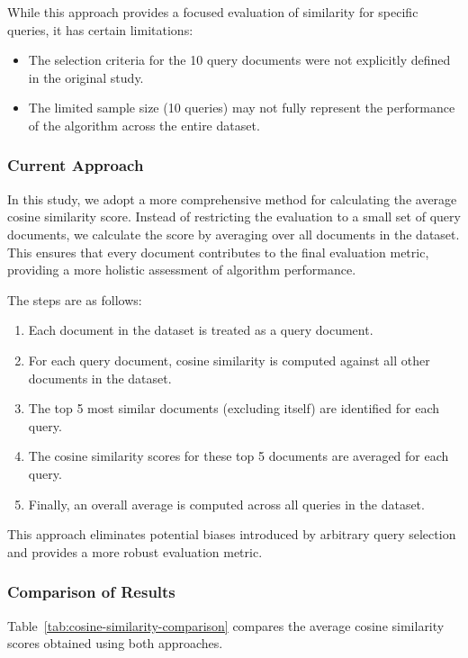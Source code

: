 \documentclass[12pt]{article}
\begin{document}
While this approach provides a focused evaluation of similarity for specific queries, it has certain limitations:
\begin{itemize}
    \item The selection criteria for the 10 query documents were not explicitly defined in the original study.
    \item The limited sample size (10 queries) may not fully represent the performance of the algorithm across the entire dataset.
\end{itemize}

\subsubsection{Current Approach}

In this study, we adopt a more comprehensive method for calculating the average cosine similarity score. Instead of restricting the evaluation to a small set of query documents, we calculate the score by averaging over all documents in the dataset. This ensures that every document contributes to the final evaluation metric, providing a more holistic assessment of algorithm performance.

The steps are as follows:
\begin{enumerate}
    \item Each document in the dataset is treated as a query document.
    \item For each query document, cosine similarity is computed against all other documents in the dataset.
    \item The top 5 most similar documents (excluding itself) are identified for each query.
    \item The cosine similarity scores for these top 5 documents are averaged for each query.
    \item Finally, an overall average is computed across all queries in the dataset.
\end{enumerate}


This approach eliminates potential biases introduced by arbitrary query selection and provides a more robust evaluation metric.

\subsubsection{Comparison of Results}

Table~\ref{tab:cosine-similarity-comparison} compares the average cosine similarity scores obtained using both approaches.
\end{document}
